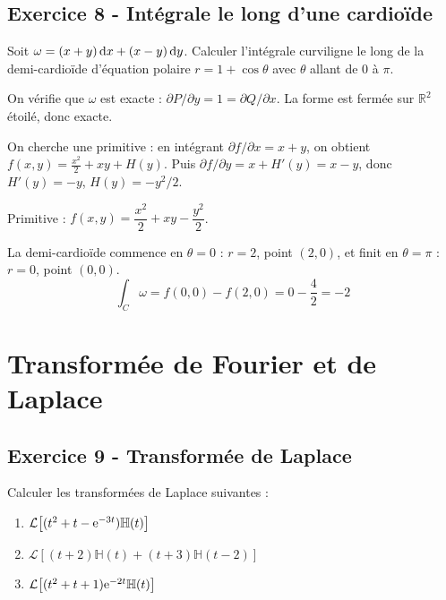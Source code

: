 \documentclass[12pt,a4paper]{article}
\begin{document}
\subsection*{Exercice 8 - Intégrale le long d'une cardioïde \niveau{\moyen}}

\begin{boiteexercice}
Soit $\omega = (x+y)\,\mathrm{d} x + (x-y)\,\mathrm{d} y$. Calculer l'intégrale curviligne le long de la demi-cardioïde d'équation polaire $r = 1 + \cos\theta$ avec $\theta$ allant de $0$ à $\pi$.
\end{boiteexercice}

\begin{boitecorrige}
On vérifie que $\omega$ est exacte : $\partial P/\partial y = 1 = \partial Q/\partial x$. La forme est fermée sur $\mathbb{R}^2$ étoilé, donc exacte.

On cherche une primitive : en intégrant $\partial f/\partial x = x+y$, on obtient $f(x,y) = \frac{x^2}{2} + xy + H(y)$. Puis $\partial f/\partial y = x + H'(y) = x - y$, donc $H'(y) = -y$, $H(y) = -y^2/2$.

Primitive : $f(x,y) = \dfrac{x^2}{2} + xy - \dfrac{y^2}{2}$.

La demi-cardioïde commence en $\theta=0$ : $r=2$, point $(2,0)$, et finit en $\theta=\pi$ : $r=0$, point $(0,0)$.
\[
\int_C \omega = f(0,0) - f(2,0) = 0 - \frac{4}{2} = -2
\]
\end{boitecorrige}

\newpage
\section{Transformée de Fourier et de Laplace}

\subsection*{Exercice 9 - Transformée de Laplace \niveau{\moyen}}

\begin{boiteexercice}
Calculer les transformées de Laplace suivantes :
\begin{enumerate}[label=(\alph*)]
  \item $\mathcal{L}\!\left[(t^2+t-\mathrm{e}^{-3t})\mathbb{H}(t)\right]$
  \item $\mathcal{L}\!\left[(t+2)\mathbb{H}(t)+(t+3)\mathbb{H}(t-2)\right]$
  \item $\mathcal{L}\!\left[(t^2+t+1)\mathrm{e}^{-2t}\mathbb{H}(t)\right]$
\end{enumerate}
\end{boiteexercice}
\end{document}
